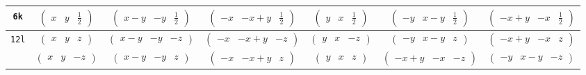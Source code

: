 \documentclass[fleqn,9pt,landscape]{jsarticle}
\begin{document}
\begin{center}
\begin{longtable}{ccccccc}
{\tt 6k} & $ \begin{pmatrix} x & y & \frac{1}{2} \end{pmatrix} $ & $ \begin{pmatrix} x - y & - y & \frac{1}{2} \end{pmatrix} $ & $ \begin{pmatrix} - x & - x + y & \frac{1}{2} \end{pmatrix} $ & $ \begin{pmatrix} y & x & \frac{1}{2} \end{pmatrix} $ & $ \begin{pmatrix} - y & x - y & \frac{1}{2} \end{pmatrix} $ & $ \begin{pmatrix} - x + y & - x & \frac{1}{2} \end{pmatrix} $ \\ \hline
{\tt 12l} & $ \begin{pmatrix} x & y & z \end{pmatrix} $ & $ \begin{pmatrix} x - y & - y & - z \end{pmatrix} $ & $ \begin{pmatrix} - x & - x + y & - z \end{pmatrix} $ & $ \begin{pmatrix} y & x & - z \end{pmatrix} $ & $ \begin{pmatrix} - y & x - y & z \end{pmatrix} $ & $ \begin{pmatrix} - x + y & - x & z \end{pmatrix} $ \\
& $ \begin{pmatrix} x & y & - z \end{pmatrix} $ & $ \begin{pmatrix} x - y & - y & z \end{pmatrix} $ & $ \begin{pmatrix} - x & - x + y & z \end{pmatrix} $ & $ \begin{pmatrix} y & x & z \end{pmatrix} $ & $ \begin{pmatrix} - x + y & - x & - z \end{pmatrix} $ & $ \begin{pmatrix} - y & x - y & - z \end{pmatrix} $ \\
\end{longtable}
\end{center}
\end{document}
